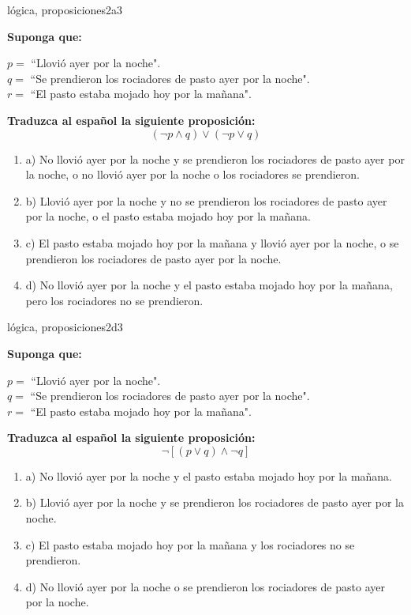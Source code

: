 \documentclass{article}
\begin{document}
\begin{question}{7}{lógica, proposiciones}{2}{a}{3}{
\textbf{Suponga que:} \medskip

\(p = \) ``Llovió ayer por la noche".\\
\(q = \) ``Se prendieron los rociadores de pasto ayer por la noche".\\
\(r = \) ``El pasto estaba mojado hoy por la mañana".\medskip

\textbf{Traduzca al español la siguiente proposición:}
\[
(\neg p \land q) \lor (\neg p \lor q)
\]

\begin{enumerate}
   \item a) No llovió ayer por la noche y se prendieron los rociadores de pasto ayer por la noche, o no llovió ayer por la noche o los rociadores se prendieron.  
   \item b) Llovió ayer por la noche y no se prendieron los rociadores de pasto ayer por la noche, o el pasto estaba mojado hoy por la mañana.  
   \item c) El pasto estaba mojado hoy por la mañana y llovió ayer por la noche, o se prendieron los rociadores de pasto ayer por la noche.  
   \item d) No llovió ayer por la noche y el pasto estaba mojado hoy por la mañana, pero los rociadores no se prendieron.  
\end{enumerate}
}
\end{question}

\begin{question}{8}{lógica, proposiciones}{2}{d}{3}{
\textbf{Suponga que:} \medskip

\(p = \) ``Llovió ayer por la noche".\\
\(q = \) ``Se prendieron los rociadores de pasto ayer por la noche".\\
\(r = \) ``El pasto estaba mojado hoy por la mañana".\medskip

\textbf{Traduzca al español la siguiente proposición:}
\[
\neg [(p \lor q) \land \neg q]
\]

\begin{enumerate}
   \item a) No llovió ayer por la noche y el pasto estaba mojado hoy por la mañana. 
   \item b) Llovió ayer por la noche y se prendieron los rociadores de pasto ayer por la noche.  
   \item c) El pasto estaba mojado hoy por la mañana y los rociadores no se prendieron.  
   \item d) No llovió ayer por la noche o se prendieron los rociadores de pasto ayer por la noche. 
\end{enumerate}
}
\end{question}
\end{document}
